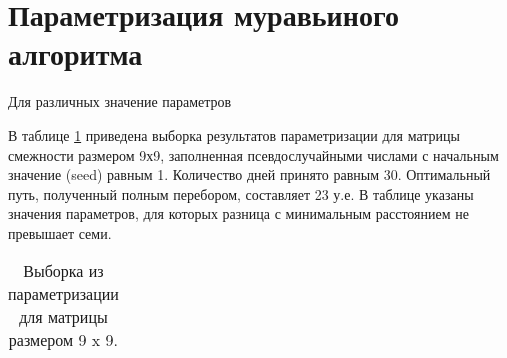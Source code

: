     \section{Параметризация муравьиного алгоритма}
        Для различных значение параметров

        В таблице \ref{table:test:params} приведена выборка результатов параметризации
        для матрицы смежности размером 9х9, 
        заполненная псевдослучайными числами с начальным значение (seed) равным 1.
        Количество дней принято равным 30. 
        Оптимальный путь, полученный полным перебором, составляет 23 у.е.
        В таблице указаны значения параметров, для которых разница с 
        минимальным расстоянием не превышает семи.

    \begin{longtable}[c]{|c|c|c|c|}
        \caption{Выборка из параметризации для матрицы размером 9 x 9.}
        \label{table:test:params} \\


\end{longtable}
